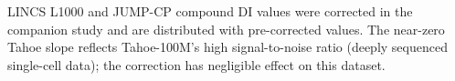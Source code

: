 \documentclass[11pt]{article}
\begin{document}
LINCS L1000 and JUMP-CP compound DI values were corrected in the
companion study \citep{tower2026confound} and are distributed with
pre-corrected values.  The near-zero Tahoe slope reflects Tahoe-100M's
high signal-to-noise ratio (deeply sequenced single-cell data); the
correction has negligible effect on this dataset.
\end{document}
